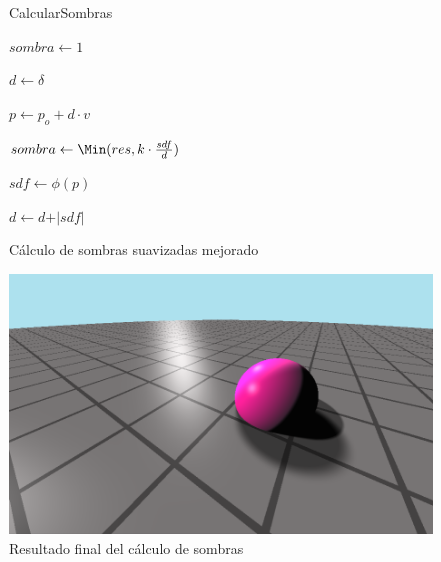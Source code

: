 \begin{figure}[ht!]
    \centering
   \begin{algorithm}[H]
        \caption{CalcularSombras}
            $sombra \gets 1$
            
            $d \gets \delta$ 
            
             {
                $p \gets p_o + d \cdot v$
                
                $sombra \gets \Min(res, k\cdot \frac{sdf}{d})$
                
                $sdf \gets \phi(p)$

                $d \gets d + \vert sdf\vert$
                
            }

    \end{algorithm}

    \caption{Cálculo de sombras suavizadas mejorado}
    \label{fig:sombras3}
\end{figure}

\begin{figure}[ht!]
    \centering
    \includegraphics[width=\textwidth]{Plantilla-TFG-master/img/shadowSoft.png}
    \caption{Resultado final del cálculo de sombras}
    \label{fig:sombras4}
\end{figure}



